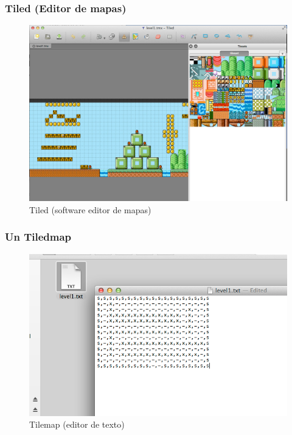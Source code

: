 \documentclass[xcolor={dvipsnames}]{beamer}
\begin{document}
\begin{frame}\frametitle{Tiled (Editor de mapas)}
    \begin{figure}
    \includegraphics[scale=0.2]{images/tiled} 
    \caption{Tiled (software editor de mapas)}
    \end{figure}
\end{frame}

\begin{frame}\frametitle{Un Tiledmap}
    \begin{figure}
    \includegraphics[scale=0.4]{images/tiledmap2} 
    \caption{Tilemap (editor de texto)}
    \end{figure}
\end{frame}
\end{document}
